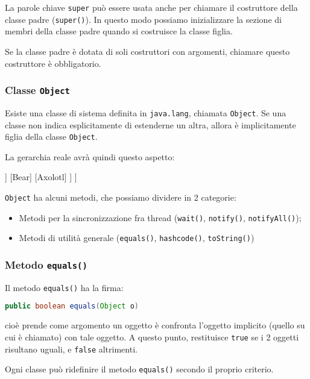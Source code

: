 \documentclass[a4paper,11pt]{article}
\begin{document}
La parole chiave \lstinline|super| può essere usata anche per chiamare il costruttore della classe padre (\lstinline|super()|).
In questo modo possiamo inizializzare la sezione di membri della classe padre quando si costruisce la classe figlia.

Se la classe padre è dotata di soli costruttori con argomenti, chiamare questo costruttore è obbligatorio.

\subsubsection{Classe \lstinline|Object|}
Esiste una classe di sistema definita in \lstinline|java.lang|, chiamata \lstinline|Object|.
Se una classe non indica esplicitamente di estenderne un altra, allora è implicitamente figlia della classe \lstinline|Object|.

La gerarchia reale avrà quindi questo aspetto:
\begin{center}
	\begin{forest}
		[Object, rectstyle	
			[Animal
				[Dog
					[Bulldog]
					[Chihuaha]
					[Hound]
				]
				[Bear]
				[Axolotl]
			]
		]
	\end{forest}
\end{center}

\lstinline|Object| ha alcuni metodi, che possiamo dividere in 2 categorie:
\begin{itemize}
	\item Metodi per la sincronizzazione fra thread (\lstinline|wait()|, \lstinline|notify()|, \lstinline|notifyAll()|);
	\item Metodi di utilità generale (\lstinline|equals()|, \lstinline|hashcode()|, \lstinline|toString()|)
\end{itemize}

\subsubsection{Metodo \lstinline|equals()|}
Il metodo \lstinline|equals()| ha la firma:
\begin{lstlisting}[language=java, style=codestyle]	
public boolean equals(Object o)
\end{lstlisting}
cioè prende come argomento un oggetto è confronta l'oggetto implicito (quello su cui è chiamato) con tale oggetto.
A questo punto, restituisce \lstinline|true| se i 2 oggetti risultano uguali, e \lstinline|false| altrimenti.

Ogni classe può ridefinire il metodo \lstinline|equals()| secondo il proprio criterio.
\end{document}
